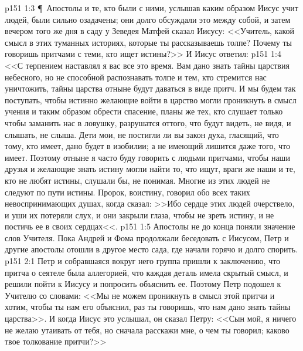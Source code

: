 \vs p151 1:3 \P\ Апостолы и те, кто были с ними, услышав каким образом Иисус учит людей, были сильно озадачены; они долго обсуждали это между собой, и затем вечером того же дня в саду у Зеведея Матфей сказал Иисусу: <<Учитель, какой смысл в этих туманных историях, которые ты рассказываешь толпе? Почему ты говоришь притчами с теми, кто ищет истины?>> И Иисус ответил:
\vs p151 1:4 <<С терпением наставлял я вас все это время. Вам дано знать тайны царствия небесного, но не способной распознавать толпе и тем, кто стремится нас уничтожить, тайны царства отныне будут даваться в виде притч. И мы будем так поступать, чтобы истинно желающие войти в царство могли проникнуть в смысл учения и таким образом обрести спасение, планы же тех, кто слушает только чтобы заманить нас в ловушку, разрушатся оттого, что будут видеть, не видя, и слышать, не слыша. Дети мои, не постигли ли вы закон духа, гласящий, что тому, кто имеет, дано будет в изобилии; а не имеющий лишится даже того, что имеет. Поэтому отныне я часто буду говорить с людьми притчами, чтобы наши друзья и желающие знать истину могли найти то, что ищут, враги же наши и те, кто не любят истины, слушали бы, не понимая. Многие из этих людей не следуют по пути истины. Пророк, воистину, говорил обо всех таких невоспринимающих душах, когда сказал: >>Ибо сердце этих людей очерствело, и уши их потеряли слух, и они закрыли глаза, чтобы не зреть истину, и не постичь ее в своих сердцах<<.
\vs p151 1:5 Апостолы не до конца поняли значение слов Учителя. Пока Андрей и Фома продолжали беседовать с Иисусом, Петр и другие апостолы отошли в другое место сада, где начали горячо и долго спорить.
\vs p151 2:1 Петр и собравшаяся вокруг него группа пришли к заключению, что притча о сеятеле была аллегорией, что каждая деталь имела скрытый смысл, и решили пойти к Иисусу и попросить объяснить ее. Поэтому Петр подошел к Учителю со словами: <<Мы не можем проникнуть в смысл этой притчи и хотим, чтобы ты нам его объяснил, раз ты говоришь, что нам дано знать тайны царства>>. И когда Иисус это услышал, он сказал Петру: <<Сын мой, я ничего не желаю утаивать от тебя, но сначала расскажи мне, о чем ты говорил; каково твое толкование притчи?>>
